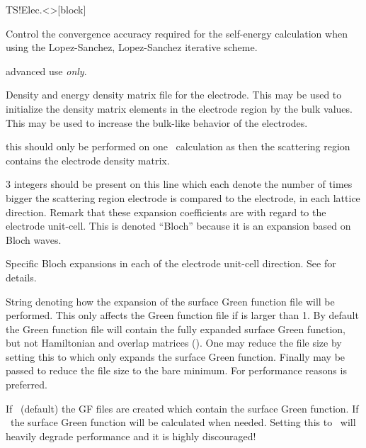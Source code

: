 \begin{fdfentry}{TS!Elec.<>}[block]
\begin{fdfoptions}
    \option[Accuracy]%
    Control the convergence accuracy required for the self-energy
    calculation when using the Lopez-Sanchez, Lopez-Sanchez iterative
    scheme. 

    \note advanced use \emph{only}.
    
    \option[DE]%
    Density and energy density matrix file for the electrode. This may
    be used to initialize the density matrix elements in the electrode
    region by the bulk values. This may be used to increase the
    bulk-like behavior of the electrodes. 

    \note this should only be performed on one \tsiesta\ calculation
    as then the scattering region  contains the
    electrode density matrix.

    \option[Bloch]%
    $3$ integers should be present on this line which each denote the
    number of times bigger the scattering region electrode is compared
    to the electrode, in each lattice direction. Remark that these
    expansion coefficients are with regard to the electrode unit-cell.
    This is denoted ``Bloch'' because it is an expansion based on
    Bloch waves.

    \option[Bloch-A/a1|B/a2|C/a3]%
    Specific Bloch expansions in each of the electrode unit-cell
    direction. See  for details.

    String denoting how the expansion of the surface Green function
    file will be performed. This only affects the Green function file
    if  is larger than 1. By default the Green function
    file will contain the fully expanded surface Green function, but
    not Hamiltonian and overlap matrices (). One may
    reduce the file size by setting this to  which only
    expands the surface Green function. Finally  may be
    passed to reduce the file size to the bare minimum.
    For performance reasons  is preferred. 

    If \fdftrue\ (default) the GF files are created which contain
    the surface Green function.
    If \fdffalse\ the surface Green function will be calculated when
    needed. 
    Setting this to \fdffalse\ will heavily degrade performance and
    it is highly discouraged!


\end{fdfoptions}
\end{fdfentry}
